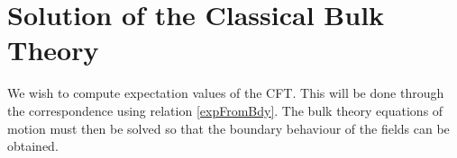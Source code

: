\documentclass[12pt]{report}
\renewcommand{\d}{\ensuremath{\mathrm{d}}}
\newcommand{\e}{\ensuremath{\mathrm{e}}}
\renewcommand{\L}{\ensuremath{\mathcal{L}}}
\renewcommand{\i}{\ensuremath{i}}
\begin{document}

\chapter{Solution of the Classical Bulk Theory}
We wish to compute expectation values of the CFT. This will be done through the correspondence using relation \eqref{expFromBdy}. The bulk theory equations of motion must then be solved so that the boundary behaviour of the fields can be obtained.
\end{document}
